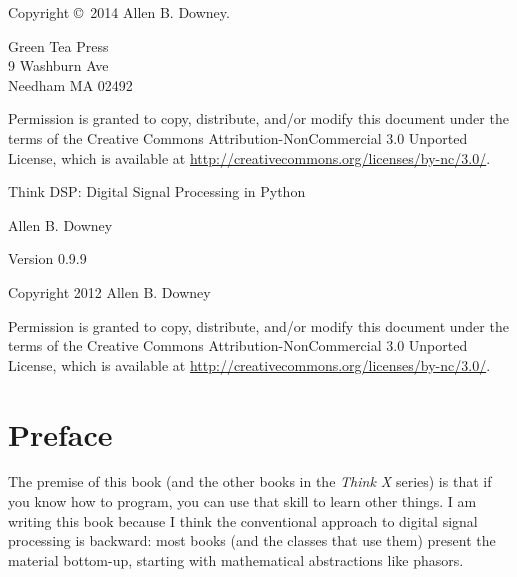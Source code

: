 \documentclass[12pt]{book}
\newcommand{\thetitle}{Think DSP: Digital Signal Processing in Python}
\newcommand{\theversion}{0.9.9}
\begin{document}
\begin{latexonly}
Copyright \copyright ~2014 Allen B. Downey.


\vspace{0.2in}

\begin{flushleft}
Green Tea Press       \\
9 Washburn Ave \\
Needham MA 02492
\end{flushleft}

Permission is granted to copy, distribute, and/or modify this document
under the terms of the Creative Commons Attribution-NonCommercial 3.0 Unported
License, which is available at \url{http://creativecommons.org/licenses/by-nc/3.0/}.

\vspace{0.2in}

\end{latexonly}



\begin{htmlonly}


{\Large \thetitle}

{\large Allen B. Downey}

Version \theversion

\vspace{0.25in}

Copyright 2012 Allen B. Downey

\vspace{0.25in}

Permission is granted to copy, distribute, and/or modify this document
under the terms of the Creative Commons Attribution-NonCommercial 3.0
Unported License, which is available at
\url{http://creativecommons.org/licenses/by-nc/3.0/}.

\setcounter{chapter}{-1}

\end{htmlonly}

\fi

\chapter{Preface}
\label{preface}

The premise of this book (and the other books in the {\it Think X}
series) is that if you know how to program, you can use that skill to
learn other things.  I am writing this book because I think the
conventional approach to digital signal processing is backward: most
books (and the classes that use them) present the material bottom-up,
starting with mathematical abstractions like phasors.
\end{document}
